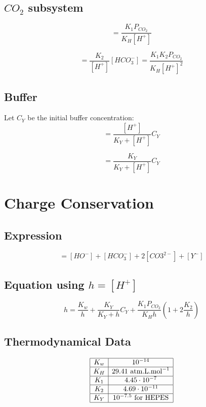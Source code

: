 \documentclass[aps,12pt]{revtex4}
\begin{document}
\subsection{$CO_2$ subsystem}
\begin{equation}
[HCO_3^-] = \dfrac{K_1 P_{CO_2}}{K_H [H^+] } 
\end{equation}

\begin{equation}
[CO_3^{2-}] = \dfrac{K_2}{[H^+] }  [HCO_3^-]  = \dfrac{K_1 K_2 P_{CO_2}}{K_H [H^+]^2 } 
\end{equation}

\subsection{Buffer}
Let $C_Y$ be the initial buffer concentration:
\begin{equation}
	[HY] = \dfrac{[H^+]}{K_Y + [H^+]} C_Y
\end{equation}

\begin{equation}
	[Y^-] = \dfrac{K_Y}{K_Y + [H^+]} C_Y
\end{equation}

\section{Charge Conservation}

\subsection{Expression}

\begin{equation}
	[H^+] = [HO^-] + [HCO_3^-] + 2[CO3^{2-}] + [Y^-]
\end{equation}

\subsection{Equation using $h=[H^+]$}

\begin{equation}
	h = \dfrac{K_w}{h} + \dfrac{K_Y}{K_Y + h} C_Y + \dfrac{K_1 P_{CO_2}}{K_H h } \left( 1 + 2 \dfrac{K_2}{h} \right)
\end{equation}	

\subsection{Thermodynamical Data}

\begin{equation}
\begin{array}{|c|c|}
\hline
K_w & 10^{-14} \\
\hline
K_H & 29.41\text{ atm.L.mol}^{-1}\\
\hline
K_1 & 4.45 \cdot 10^{-7}\\
\hline
K_2 & 4.69 \cdot 10^{-11}\\
\hline
K_Y & 10^{-7.5} \text{ for HEPES}\\
\hline
\end{array}
\end{equation}
\end{document}
